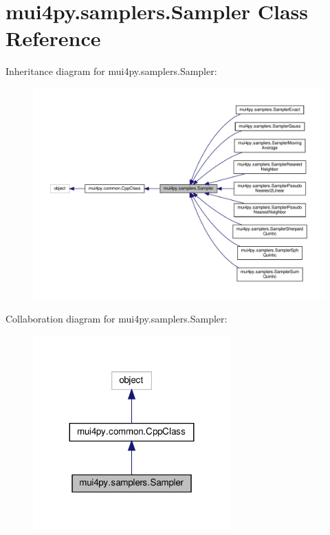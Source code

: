 \hypertarget{classmui4py_1_1samplers_1_1_sampler}{}\section{mui4py.\+samplers.\+Sampler Class Reference}
\label{classmui4py_1_1samplers_1_1_sampler}


Inheritance diagram for mui4py.\+samplers.\+Sampler\+:
\nopagebreak
\begin{figure}[H]
\begin{center}
\leavevmode
\includegraphics[width=350pt]{classmui4py_1_1samplers_1_1_sampler__inherit__graph}
\end{center}
\end{figure}


Collaboration diagram for mui4py.\+samplers.\+Sampler\+:
\nopagebreak
\begin{figure}[H]
\begin{center}
\leavevmode
\includegraphics[width=215pt]{classmui4py_1_1samplers_1_1_sampler__coll__graph}
\end{center}
\end{figure}
